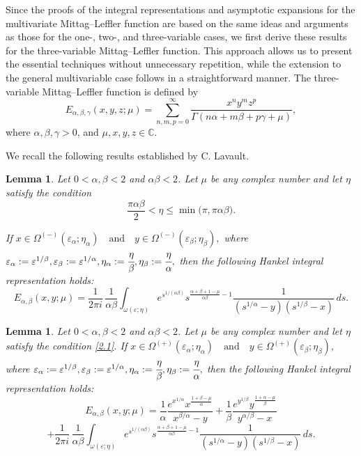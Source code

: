 \documentclass[12pt, reqno]{amsart}
\newtheorem{lemma}[theorem]{Lemma}
\theoremstyle{definition}
\theoremstyle{remark}
\numberwithin{equation}{section}
\begin{document}
Since the proofs of the integral representations and asymptotic expansions for the multivariate Mittag--Leffler function are based on the same ideas and arguments as those for the one-, two-, and three-variable cases, we first derive these results for the three-variable Mittag--Leffler function. This approach allows us to present the essential techniques without unnecessary repetition, while the extension to the general multivariable case follows in a straightforward manner.
The three-variable Mittag–Leffler function is defined by
$$E_{\alpha,\beta,\gamma}(x,y,z;\mu)
=
\sum_{n,m,p=0}^{\infty}
\frac{x^n y^m z^p}
{\Gamma(n\alpha+m\beta+p\gamma+\mu)},$$
where \(\alpha,\beta,\gamma>0\), and \(\mu,x,y,z\in\mathbb{C}\).

We recall the following results established by C. Lavault. 
\begin{lemma}\cite{Lavault}\label{l2.1}
    Let $0 < \alpha, \beta < 2$ and $\alpha\beta < 2$. Let $\mu$ be any complex number and let $\eta$ satisfy the condition
\begin{equation}\label{2.1}
\frac{\pi\alpha\beta}{2}
<
\eta
\leq
\min\!\bigl(\pi,\pi\alpha\beta\bigr).
\end{equation}

If
$
x \in \Omega^{(-)}(\varepsilon_\alpha;\eta_\alpha)
\quad\text{and}\quad
y \in \Omega^{(-)}(\varepsilon_\beta;\eta_\beta),
$
where
$
\varepsilon_\alpha:=\varepsilon^{1/\beta},
\varepsilon_\beta:=\varepsilon^{1/\alpha},
\eta_\alpha:=\cfrac{\eta}{\beta},
\eta_\beta:=\cfrac{\eta}{\alpha},
$
then the following Hankel integral representation holds:
\[
E_{\alpha,\beta}(x,y;\mu)
=
\frac{1}{2\pi i}\,
\frac{1}{\alpha\beta}
\int_{\omega(\varepsilon;\eta)}
e^{s^{1/(\alpha\beta)}}
s^{\frac{\alpha+\beta+1-\mu}{\alpha\beta}-1}
\frac{1}
{\left(s^{1/\alpha}-y\right)
 \left(s^{1/\beta}-x\right)}
\,ds .
\]
\end{lemma}

\begin{lemma}\cite{Lavault}\label{l2.2}
    Let $0 < \alpha, \beta < 2$ and $\alpha\beta < 2$. Let $\mu$ be any complex number and let $\eta$ satisfy the condition \eqref{2.1}.
If
$
x \in \Omega^{(+)}(\varepsilon_\alpha;\eta_\alpha)
\quad\text{and}\quad
y \in \Omega^{(+)}(\varepsilon_\beta;\eta_\beta),
$
where
$
\varepsilon_\alpha:=\varepsilon^{1/\beta},
\varepsilon_\beta:=\varepsilon^{1/\alpha},
\eta_\alpha:=\cfrac{\eta}{\beta},
\eta_\beta:=\cfrac{\eta}{\alpha},
$
then the following Hankel integral representation holds:
\[
E_{\alpha,\beta}(x,y;\mu)
=
\frac{1}{\alpha}
\frac{e^{x^{1/\alpha}}x^{\frac{1+\beta-\mu}{\alpha}}}
{x^{\beta/\alpha}-y}
+
\frac{1}{\beta}
\frac{e^{y^{1/\beta}}y^{\frac{1+\alpha-\mu}{\beta}}}
{y^{\alpha/\beta}-x}
\]
\[+\frac{1}{2\pi i}\,
\frac{1}{\alpha\beta}
\int_{\omega(\varepsilon;\eta)}
e^{s^{1/(\alpha\beta)}}
s^{\frac{\alpha+\beta+1-\mu}{\alpha\beta}-1}
\frac{1}
{\left(s^{1/\alpha}-y\right)
 \left(s^{1/\beta}-x\right)}
\,ds .
\]
\end{lemma}
\end{document}
